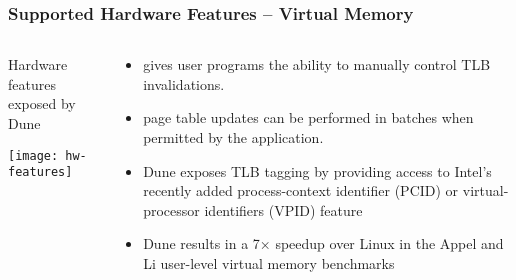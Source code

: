 \begin{frame}[plain]
	\frametitle{Supported Hardware Features -- Virtual Memory}
	
	
	
	\begin{columns}
		
		\begin{column}{.4\textwidth}
			\centering
			Hardware features exposed by Dune
			
			\texttt{[image: hw-features]}
			
		\end{column}
		
		\begin{column}{.6\textwidth}
			
			
			\begin{itemize}
				\item  gives user programs the ability to manually
				control TLB invalidations.
				\item page table updates can be performed in batches when permitted by the application. 
				\item Dune exposes TLB tagging by providing access to Intel's recently added process-context identifier (PCID) or virtual-processor identifiers (VPID) feature
				\item Dune results in a 7× speedup	over Linux in the Appel and Li user-level virtual memory	benchmarks 
				
			\end{itemize}					
			
		\end{column}
			
		
	\end{columns}
	
	
\end{frame}



